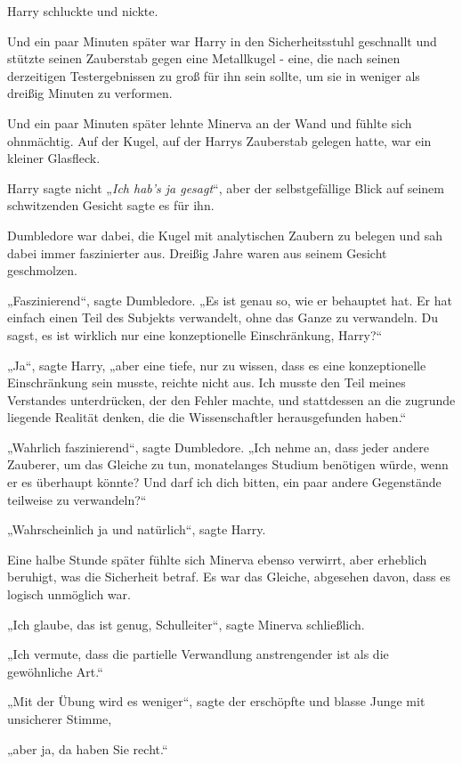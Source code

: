 {Harry schluckte und nickte.

Und ein paar Minuten später war Harry in den Sicherheitsstuhl geschnallt und stützte seinen Zauberstab gegen eine Metallkugel - eine, die nach seinen derzeitigen Testergebnissen zu groß für ihn sein sollte, um sie in weniger als dreißig Minuten zu verformen.

Und ein paar Minuten später lehnte Minerva an der Wand und fühlte sich ohnmächtig. Auf der Kugel, auf der Harrys Zauberstab gelegen hatte, war ein kleiner Glasfleck.

Harry sagte nicht „\emph{Ich hab's ja gesagt}“, aber der selbstgefällige Blick auf seinem schwitzenden Gesicht sagte es für ihn.

Dumbledore war dabei, die Kugel mit analytischen Zaubern zu belegen und sah dabei immer faszinierter aus. Dreißig Jahre waren aus seinem Gesicht geschmolzen.

„Faszinierend“, sagte Dumbledore. „Es ist genau so, wie er behauptet hat. Er hat einfach einen Teil des Subjekts verwandelt, ohne das Ganze zu verwandeln. Du sagst, es ist wirklich nur eine konzeptionelle Einschränkung, Harry?“

„Ja“, sagte Harry, „aber eine tiefe, nur zu wissen, dass es eine konzeptionelle Einschränkung sein musste, reichte nicht aus. Ich musste den Teil meines Verstandes unterdrücken, der den Fehler machte, und stattdessen an die zugrunde liegende Realität denken, die die Wissenschaftler herausgefunden haben.“

„Wahrlich faszinierend“, sagte Dumbledore. „Ich nehme an, dass jeder andere Zauberer, um das Gleiche zu tun, monatelanges Studium benötigen würde, wenn er es überhaupt könnte? Und darf ich dich bitten, ein paar andere Gegenstände teilweise zu verwandeln?“

„Wahrscheinlich ja und natürlich“, sagte Harry.

Eine halbe Stunde später fühlte sich Minerva ebenso verwirrt, aber erheblich beruhigt, was die Sicherheit betraf. Es war das Gleiche, abgesehen davon, dass es logisch unmöglich war.

„Ich glaube, das ist genug, Schulleiter“, sagte Minerva schließlich.

„Ich vermute, dass die partielle Verwandlung anstrengender ist als die gewöhnliche Art.“

„Mit der Übung wird es weniger“, sagte der erschöpfte und blasse Junge mit unsicherer Stimme,

„aber ja, da haben Sie recht.“

}
